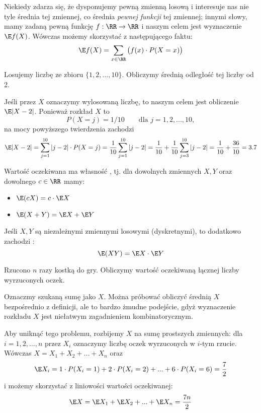 Niekiedy zdarza się, że dysponujemy pewną zmienną losową i interesuje nas nie tyle średnia tej zmiennej, co średnia \textit{pewnej funkcji} tej zmiennej; innymi słowy, mamy zadaną pewną funkcję $f : \RR \to \RR$ i naszym celem jest wyznaczenie $\E f(X)$. Wówczas możemy skorzystać z następującego faktu:
$$\E f(X) = \sum_{x \in \RR} \big(f(x) \cdot P(X = x)\big)$$

\begin{example}
    Losujemy liczbę ze zbioru $\{1, 2, ..., 10\}$. Obliczymy średnią odległość tej liczby od 2.

    Jeśli przez $X$ oznaczymy wylosowaną liczbę, to naszym celem jest obliczenie $\E |X - 2|$. Ponieważ rozkład $X$ to
    $$P(X = j) = 1/10 \qquad \text{dla } j = 1, 2, ..., 10,$$
    na mocy powyższego twierdzenia zachodzi
    $$\E |X - 2| = \sum_{j = 1}^{10} |j - 2| \cdot P(X = j) = \frac{1}{10} \sum_{j = 1}^{10} |j - 2| = \frac{1}{10} + \frac{1}{10} \sum_{j = 3}^{10} |j - 2| = \frac{1}{10} + \frac{36}{10} = 3.7$$
\end{example}

Wartość oczekiwana ma własność , tj. dla dowolnych zmiennych $X, Y$ oraz dowolnego $c \in \RR$ mamy:
\begin{itemize}
    \item $\E (cX) = c \cdot \E X$
    \item $\E (X+Y) = \E X + \E Y$
\end{itemize}

Jeśli $X,Y$ są niezależnymi zmiennymi losowymi (dyskretnymi), to dodatkowo zachodzi : $$\E (XY) = \E X \cdot \E Y$$

\begin{example}
    Rzucono $n$ razy kostką do gry. Obliczymy wartość oczekiwaną łącznej liczby wyrzuconych oczek.

    Oznaczmy szukaną sumę jako $X$. Można próbować obliczyć średnią $X$ bezpośrednio z definicji, ale to bardzo żmudne podejście, gdyż wyznaczenie rozkładu $X$ jest niełatwym zagadnieniem kombinatorycznym.
    
    Aby uniknąć tego problemu, rozbijemy $X$ na sumę prostszych zmiennych: dla $i = 1, 2, ..., n$ przez $X_i$ oznaczymy liczbę oczek wyrzuconych w $i$-tym rzucie. Wówczas $X = X_1 + X_2 + ... + X_n$ oraz 
    $$\E X_i = 1 \cdot P(X_i = 1) + 2 \cdot P(X_i = 2) + ... + 6 \cdot P(X_i = 6) = \frac{7}{2}$$
    i możemy skorzystać z liniowości wartości oczekiwanej:
    $$\E X = \E X_1 + \E X_2 + ... + \E X_n = \frac{7n}{2}$$
\end{example}

